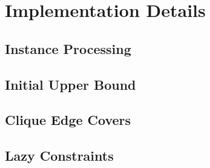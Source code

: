 \chapter{Implementation Details}

\section{Instance Processing}

\section{Initial Upper Bound}

\section{Clique Edge Covers}

\section{Lazy Constraints}